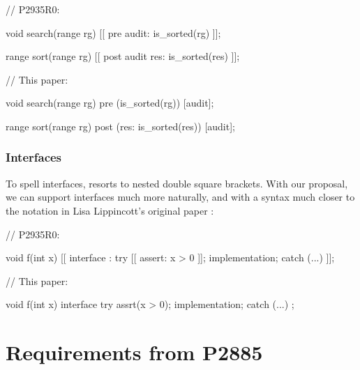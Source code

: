 \begin{minipage}{8cm}
\begin{codeblock}
// P2935R0:

void search(range rg)
  [[ pre audit: is_sorted(rg) ]];
  
range sort(range rg)
  [[ post audit res: is_sorted(res) ]];
\end{codeblock}
\end{minipage}
\begin{minipage}{8cm}
\begin{codeblock}
// This paper:

void search(range rg)
  pre (is_sorted(rg)) [audit];
  
range sort(range rg)
  post (res: is_sorted(res)) [audit];
\end{codeblock}
\end{minipage}

\subsubsection{Interfaces}
\label{subsubsec:interfaces}

To spell interfaces, \cite{P2935R0} resorts to nested double square brackets. With our proposal, we can support interfaces much more naturally, and with a syntax much closer to the notation in Lisa Lippincott's original paper \cite{P0465R0}:
\\

\begin{minipage}{8cm}
\begin{codeblock}
// P2935R0:

void f(int x)
  [[ interface :
    try {
      [[ assert: x > 0 ]];
      implementation;
    } 
    catch (...) {}
  ]];
\end{codeblock}
\end{minipage}
\begin{minipage}{8cm}
\begin{codeblock}
// This paper:

void f(int x)
interface {
  try {
    assrt(x > 0);
    implementation;
  } 
  catch (...) {}
};
\end{codeblock}
\end{minipage}

\section{Requirements from P2885}
\label{sec:requirements}

